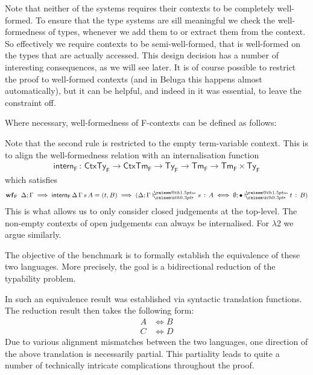 \documentclass[a4paper,UKenglish]{lipics-v2016}
\makeatletter
\newcommand{\ms}{\,}
\newcommand{\mrel}[1]{\mathrel{\ms #1 \ms}}
\newcommand{\dom}[1]{\ensuremath{\textrm{dom($#1$)}}}
\newcommand{\OF}{\mrel{:}}
\newcommand{\SysF}{\ensuremath{\mathsf{F}}\xspace}
\newcommand{\SysL}{$\lambda$2\xspace}
\newcommand{\TyF}{\ensuremath{\mathsf{Ty_{F}}}}
\newcommand{\TmF}{\ensuremath{\mathsf{Tm_{F}}}}
\newcommand{\ty}{\mathsf{ty}}
\newcommand{\tm}{\mathsf{tm}}
\newcommand{\of}{\ensuremath{\!:\!}}
\newcommand{\cc}[2]{#1;#2} %
\newcommand{\raisemath}[1]{\mathpalette{\raisem@th{#1}}}
\newcommand{\raisem@th}[3]{\raisebox{#1}{\ensuremath{#2#3}}}
\newcommand{\tsAnnot}[2]{\vdash\hspace{-.7em}^{\raisemath{1.5pt}{\scriptscriptstyle{#2}}}_{\raisemath{0.3pt}{\scriptscriptstyle{#1}}}} %
\newcommand{\tfF}{\tsAnnot{\SysF}{\ty}}  %
\newcommand{\tyF}{\tsAnnot{\SysF}{\tm}}  %
\newcommand{\istyF}[2]{\ensuremath{{#1} \mathrel{\tfF} #2}}
\newcommand{\typingF}[3]{\ensuremath{{#1} \mathrel{\tyF} #2 \OF #3}}
\newcommand{\emptyctx}{\ensuremath{\bullet}}
\makeatother
\begin{document}
Note that neither of the systems requires their contexts to be completely well-formed.
To ensure that the type systems are sill meaningful we check the well-formedness of types, whenever we add them to or extract them from the context.
So effectively we require contexts to be semi-well-formed, that is well-formed on the types that are actually accessed.
This design decision has a number of interesting consequences, as we will see later.
It is of course possible to restrict the proof to well-formed contexts (and in Beluga this happens almost automatically), but it can be helpful, and indeed in \cite{KaiserEtAl:2017:sysf_pts_equiv_coq} it was essential, to leave the constraint off.

Where necessary, well-formedness of F-contexts can be defined as follows:

Note that the second rule is restricted to the empty term-variable context.
This is to align the well-formedness relation with an internalisation function
\begin{align*}
  \mathsf{intern}_{\SysF} \OF \mathsf{CtxTy}_{\SysF} \to \mathsf{CtxTm}_{\SysF} \to \TyF \to \TmF \to \TmF \times \TyF
\end{align*}
which satisfies
\begin{align*}
  \mathbf{wf}_{\SysF}\;\;\cc{\Delta}{\Gamma} \implies \mathsf{intern}_{\SysF}\,\Delta\,\Gamma\,s\,A = (t,B) \implies (\typingF{\cc{\Delta}{\Gamma}}{s}{A} \iff \typingF{\cc{\emptyset}{\emptyctx}}{t}{B})
\end{align*}
This is what allows us to only consider closed judgements at the top-level.
The non-empty contexts of open judgements can always be internalised.
For \SysL we argue similarly.

The objective of the benchmark is to formally establish the equivalence of these two languages.
More precisely, the goal is a bidirectional reduction of the typability problem.

In \cite{KaiserEtAl:2017:sysf_pts_equiv_coq} such an equivalence result was established via syntactic translation functions.
The reduction result then takes the following form:
\begin{align*}
  A &\iff B\\
  C &\iff D
\end{align*}
Due to various alignment mismatches between the two languages, one direction of the above translation is necessarily partial.
This partiality leads to quite a number of technically intricate complications throughout the proof.
\end{document}
